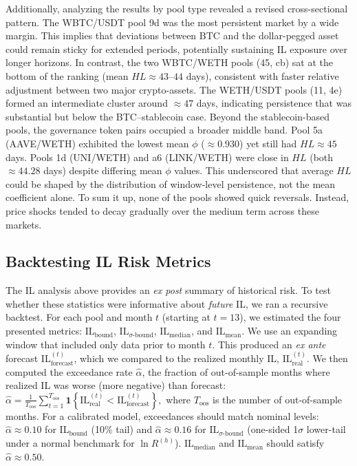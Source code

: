 \documentclass[journal]{IEEEtran}
\begin{document}
Additionally, analyzing the results by pool type revealed a revised cross-sectional pattern.
The WBTC/USDT pool 9d was the most persistent market by a wide margin. 
This implies that deviations between BTC and the dollar-pegged asset could remain sticky for extended periods, potentially sustaining IL exposure over longer horizons. 
In contrast, the two WBTC/WETH pools (45, cb) sat at the bottom of the ranking (mean $HL\approx 43$--$44$ days), consistent with faster relative adjustment between two major crypto-assets. 
The WETH/USDT pools (11, 4e) formed an intermediate cluster around $\approx 47$ days, indicating persistence that was substantial but below the BTC--stablecoin case. 
Beyond the stablecoin-based pools, the  governance token pairs occupied a broader middle band.
Pool 5a (AAVE/WETH) exhibited the lowest mean $\phi$ ($\approx0.930$) yet still had $HL\approx45$ days. 
Pools 1d (UNI/WETH) and a6 (LINK/WETH) were close in $HL$ (both $\approx44.28$ days) despite differing mean $\phi$ values. 
This underscored that average $HL$ could be shaped by the distribution of window-level persistence, not the mean coefficient alone.
To sum it up, none of the pools showed quick reversals. Instead, price shocks tended to decay gradually over the medium term across these markets.



\subsection{Backtesting IL Risk Metrics}
\label{subsec:backtesting_il}

The IL analysis above provides an \emph{ex post} summary of historical risk. 
To test whether these statistics were informative about \emph{future} IL, we ran a recursive backtest. 
For each pool and month $t$ (starting at $t=13$), we estimated the four presented metrics: $\mathrm{IL}_{\text{bound}}$, $\mathrm{IL}_{\sigma\text{-bound}}$, $\mathrm{IL}_{\text{median}}$, and $\mathrm{IL}_{\text{mean}}$. We use an expanding window that included only data prior to month $t$. 
This produced an \emph{ex ante} forecast $\mathrm{IL}^{(t)}_{\text{forecast}}$, which we compared to the realized monthly IL, $\mathrm{IL}^{(t)}_{\text{real}}$. 
We then computed the exceedance rate $\hat{\alpha}$, the fraction of out-of-sample months where realized IL was worse (more negative) than forecast:
\(
\hat{\alpha}
= \frac{1}{T_{\text{oos}}}\sum_{t=1}^{T_{\text{oos}}}
\mathbf{1}\!\left\{\mathrm{IL}^{(t)}_{\text{real}} < \mathrm{IL}^{(t)}_{\text{forecast}}\right\},
\)
where $T_{\text{oos}}$ is the number of out-of-sample months. 
For a calibrated model, exceedances should match nominal levels: $\hat{\alpha}\approx0.10$ for $\mathrm{IL}_{\text{bound}}$ (10\% tail) and $\hat{\alpha}\approx0.16$ for $\mathrm{IL}_{\sigma\text{-bound}}$ (one-sided 1$\sigma$ lower-tail under a normal benchmark for $\ln R^{(h)}$). 
$\mathrm{IL}_{\text{median}}$ and $\mathrm{IL}_{\text{mean}}$ should satisfy $\hat{\alpha}\approx0.50$.
\end{document}

